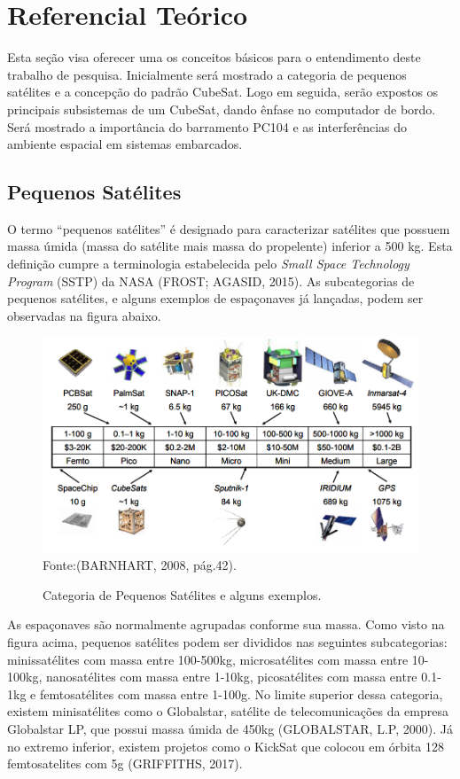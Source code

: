 \chapter[Referencial Teórico]{Referencial Teórico}

Esta seção visa oferecer uma os conceitos básicos para o entendimento deste trabalho de pesquisa. Inicialmente será mostrado a categoria de pequenos satélites e a concepção do padrão CubeSat. Logo em seguida, serão expostos os principais subsistemas de um CubeSat, dando ênfase no computador de bordo. Será mostrado a importância do barramento PC104 e as interferências do ambiente espacial em sistemas embarcados.


\section{Pequenos Satélites}

O termo “pequenos satélites” é designado para caracterizar satélites que possuem massa úmida (massa do satélite mais massa do propelente) inferior a 500 kg. Esta definição cumpre a terminologia estabelecida pelo \textit{Small Space Technology Program} (SSTP) da NASA (FROST; AGASID, 2015). As subcategorias de pequenos satélites, e alguns exemplos de espaçonaves já lançadas, podem ser observadas na figura abaixo.


\begin{figure}[h]
	\centering
    {\small\caption{Categoria de Pequenos Satélites e alguns exemplos.}}
	\includegraphics[keepaspectratio=true,scale=0.55]{figuras/categoria_satellite.PNG}
	Fonte:(BARNHART, 2008, pág.42).
	\label{fig02}
\end{figure}


As espaçonaves são normalmente agrupadas conforme sua massa. Como visto na figura acima, pequenos satélites podem ser divididos nas seguintes subcategorias: minissatélites com massa entre 100-500kg, microsatélites com massa entre 10-100kg, nanosatélites com massa entre 1-10kg, picosatélites com massa entre 0.1-1kg e femtosatélites com massa entre 1-100g. No limite superior dessa categoria, existem minisatélites como o Globalstar, satélite de telecomunicações da empresa Globalstar LP, que possui massa úmida de 450kg (GLOBALSTAR, L.P, 2000). Já no extremo inferior, existem projetos como o KickSat que colocou em órbita 128 femtosatelites  com 5g (GRIFFITHS, 2017).

